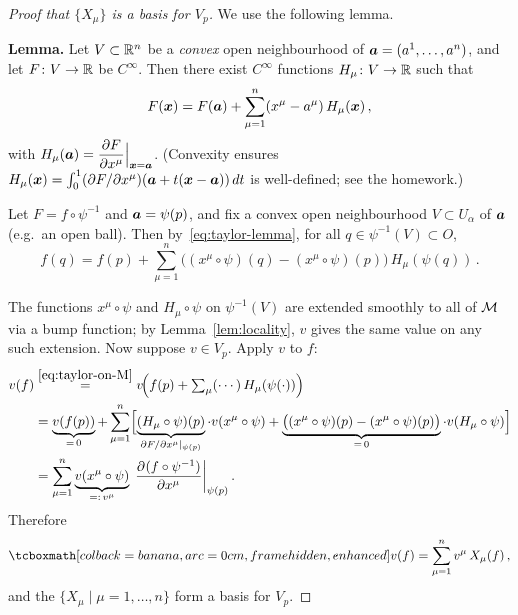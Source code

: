 \begin{proof}[Proof that $\{X_\mu\}$ is a basis for $V_p$]
  We use the following lemma.

  \smallskip\noindent
  \textbf{Lemma.}\;
  Let $V\subset\mathbb{R}^{n}$ be a \emph{convex} open neighbourhood of
  $\boldsymbol{a} = (a^1,\dots,a^n)$, and let $F\colon V\to\mathbb{R}$ be $C^\infty$.
  Then there exist $C^\infty$ functions $H_\mu\colon V\to\mathbb{R}$ such that
  \begin{equation}\label{eq:taylor-lemma}
    F(\boldsymbol{x}) = F(\boldsymbol{a})
      + \sum_{\mu=1}^{n}(x^\mu - a^\mu)\,H_\mu(\boldsymbol{x})\,,
  \end{equation}
  with
  \(
    H_\mu(\boldsymbol{a}) = \dfrac{\partial F}{\partial x^\mu}\Big|_{\boldsymbol{x}=\boldsymbol{a}}
  \).
  (Convexity ensures
  $H_\mu(\boldsymbol{x}) = \int_0^1 (\partial F/\partial x^\mu)(\boldsymbol{a}+t(\boldsymbol{x}-\boldsymbol{a}))\,dt$
  is well-defined; see the homework.)

  \smallskip
  Let $F = f\circ\psi^{-1}$ and $\boldsymbol{a} = \psi(p)$, and fix a convex open
  neighbourhood $V\subset U_\alpha$ of $\boldsymbol{a}$ (e.g.\ an open ball).
  Then by~\eqref{eq:taylor-lemma}, for all $q\in\psi^{-1}(V)\subset O$,
  \begin{equation}\label{eq:taylor-on-M}
    f(q) = f(p)
      + \sum_{\mu=1}^{n}
        \bigl((x^\mu\circ\psi)(q) - (x^\mu\circ\psi)(p)\bigr)\,
        H_\mu(\psi(q))\,.
  \end{equation}

  The functions $x^\mu\circ\psi$ and $H_\mu\circ\psi$ on $\psi^{-1}(V)$
  are extended smoothly to all of $\mathcal{M}$ via a bump function; by
  Lemma~\ref{lem:locality}, $v$ gives the same value on any such
  extension.  Now suppose $v\in V_p$.  Apply $v$ to $f$:
  \begin{align}
    v(f)
      &\stackrel{\eqref{eq:taylor-on-M}}{=}
        v\!\Bigl(f(p)
          + \textstyle\sum_{\mu} (\cdots)\,H_\mu(\psi(\cdot))\Bigr)
        \notag\\
      &= \underbrace{v(f(p))}_{=\,0}
        + \sum_{\mu=1}^{n}
          \Bigl[
            \underbrace{(H_\mu\circ\psi)(p)}_{\partial F/\partial x^\mu|_{\psi(p)}}
            \cdot v(x^\mu\circ\psi)
          + \underbrace{\bigl((x^\mu\circ\psi)(p) - (x^\mu\circ\psi)(p)\bigr)}_{=\,0}
            \cdot v(H_\mu\circ\psi)
          \Bigr]
        \notag\\
      &= \sum_{\mu=1}^{n}
          \underbrace{v(x^\mu\circ\psi)}_{=:\,v^\mu}
          \;\frac{\partial^{} (f\circ\psi^{-1})}{\partial {x^\mu}^{}}\bigg|_{\psi(p)}\,.
        \label{eq:v-expansion}
  \end{align}
  Therefore
  \begin{equation}\label{eq:v-in-basis}
    \eqbox{v(f) = \sum_{\mu=1}^{n} v^\mu\, X_\mu(f)}\,,
  \end{equation}
  and the $\{X_\mu \mid \mu = 1,\dots,n\}$ form a basis for $V_p$.
\end{proof}

